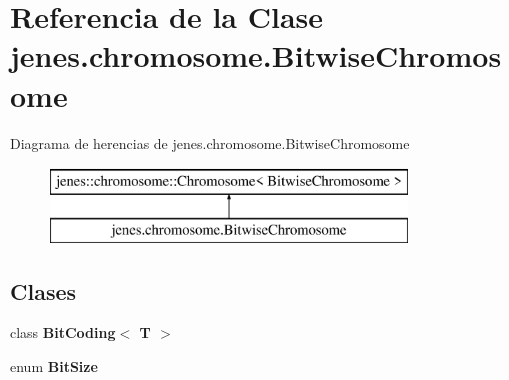 \hypertarget{classjenes_1_1chromosome_1_1_bitwise_chromosome}{\section{Referencia de la Clase jenes.\-chromosome.\-Bitwise\-Chromosome}
\label{classjenes_1_1chromosome_1_1_bitwise_chromosome}
}
Diagrama de herencias de jenes.\-chromosome.\-Bitwise\-Chromosome\begin{figure}[H]
\begin{center}
\leavevmode
\includegraphics[height=2.000000cm]{classjenes_1_1chromosome_1_1_bitwise_chromosome}
\end{center}
\end{figure}
\subsection*{Clases}
\begin{DoxyCompactItemize}
\item 
class {\bfseries Bit\-Coding$<$ T $>$}
\item 
enum {\bfseries Bit\-Size}
\end{DoxyCompactItemize}
